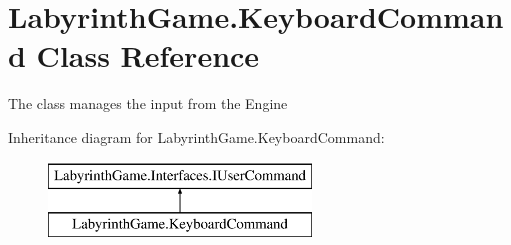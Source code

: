 \hypertarget{class_labyrinth_game_1_1_keyboard_command}{\section{Labyrinth\+Game.\+Keyboard\+Command Class Reference}
\label{class_labyrinth_game_1_1_keyboard_command}
}


The class manages the input from the Engine  


Inheritance diagram for Labyrinth\+Game.\+Keyboard\+Command\+:\begin{figure}[H]
\begin{center}
\leavevmode
\includegraphics[height=2.000000cm]{class_labyrinth_game_1_1_keyboard_command}
\end{center}
\end{figure}
